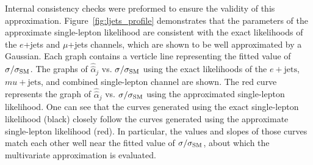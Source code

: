 Internal consistency checks were preformed to ensure the validity of this approximation.  Figure~\ref{fig:ljets_profile} demonstrates that the parameters of the approximate single-lepton likelihood are consistent with the exact likelihoods of the $e$+jets and $\mu$+jets channels, which are shown to be well approximated by a Gaussian.
Each graph contains a verticle line representing the fitted value of $\sigma/\sigma_{\rm SM}$.
The graphs of $\hat{\hat{\alpha}}_j$ vs. $\sigma/\sigma_{\rm SM}$  using the exact likelihoods of the $e+\textrm{jets}$, $mu+\textrm{jets}$, and combined single-lepton channel are shown.
The red curve represents the graph of $\hat{\hat{\alpha}}_j$ vs. $\sigma/\sigma_{\rm SM}$ using the approximated single-lepton likelihood.
One can see that the curves generated using the exact single-lepton likelihood (black) closely follow the curves generated using the approximate single-lepton likelihood (red).
In particular, the values and slopes of those curves match each other well near the fitted value of $\sigma/\sigma_{\rm SM}$, about which the multivariate approximation is evaluated. 

